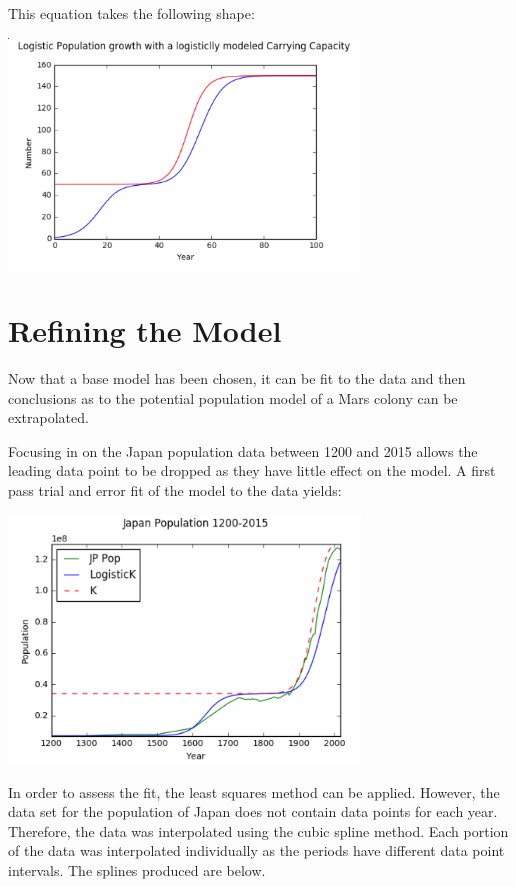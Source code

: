 \documentclass[12pt]{article}
\begin{document}
 This equation takes the following shape:
 
\begin{minipage}{\textwidth}
		\centering
		\includegraphics[width=0.7\textwidth]{logKLog}
\end{minipage}\hfill


 
 \section{Refining the Model}
 
Now that a base model has been chosen, it can be fit to the data and then conclusions as to the potential population model of a Mars colony can be extrapolated.


Focusing in on the Japan population data between 1200 and 2015 allows the leading data point to be dropped as they have little effect on the model. A first pass trial and error fit of the model to the data yields:
 
\begin{minipage}{\textwidth}
		\centering
		\includegraphics[width=0.7\textwidth]{firstPass}
\end{minipage}\hfill


  
  In order to assess the fit, the least squares method can be applied. However, the data set for the population of Japan\cite{un} \cite{japan} does not contain data points for each year. Therefore, the data was interpolated using the cubic spline method. Each portion of the data was interpolated individually as the periods have different data point intervals. The splines produced are below.
  
\end{document}
